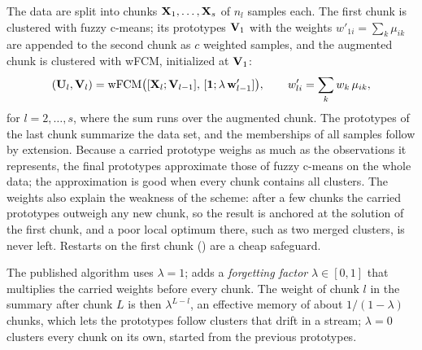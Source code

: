 The data are split into chunks $\mathbf{X}_1,\dots,\mathbf{X}_s$ of $n_l$ samples each. The first chunk is clustered with fuzzy c-means; its prototypes $\mathbf{V}_1$ with the weights $w'_{1i}=\sum_k\mu_{ik}$ are appended to the second chunk as $c$ weighted samples, and the augmented chunk is clustered with wFCM, initialized at $\mathbf{V}_1$:
\begin{equation}
  (\mathbf{U}_l,\mathbf{V}_l)=\text{wFCM}\big([\mathbf{X}_l;\mathbf{V}_{l-1}],\,[\mathbf{1};\lambda\,\mathbf{w}'_{l-1}]\big),\qquad
  w'_{li}=\sum_k w_k\,\mu_{ik},
  \label{eq:data:sp}
\end{equation}
for $l=2,\dots,s$, where the sum runs over the augmented chunk. The prototypes of the last chunk summarize the data set, and the memberships of all samples follow by extension. Because a carried prototype weighs as much as the observations it represents, the final prototypes approximate those of fuzzy c-means on the whole data; the approximation is good when every chunk contains all clusters. The weights also explain the weakness of the scheme: after a few chunks the carried prototypes outweigh any new chunk, so the result is anchored at the solution of the first chunk, and a poor local optimum there, such as two merged clusters, is never left. Restarts on the first chunk () are a cheap safeguard.

The published algorithm uses $\lambda=1$;  adds a \emph{forgetting factor} $\lambda\in[0,1]$ that multiplies the carried weights before every chunk. The weight of chunk $l$ in the summary after chunk $L$ is then $\lambda^{L-l}$, an effective memory of about $1/(1-\lambda)$ chunks, which lets the prototypes follow clusters that drift in a stream; $\lambda=0$ clusters every chunk on its own, started from the previous prototypes.

